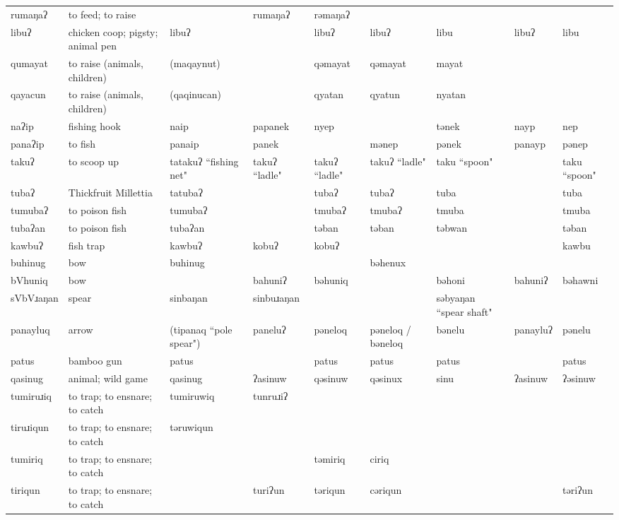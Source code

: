 \begin{landscape}
\begin{longtable}{*{9}{p{}}}
\text{*}rumaŋaʔ & to feed; to raise &  & rumaŋaʔ & rəmaŋaʔ &  &  &  & \\
\text{*}libuʔ & chicken coop; pigsty; animal pen & libuʔ &  & libuʔ & libuʔ & libu & libuʔ & libu\\
\text{*}qumayat & to raise (animals, children) & (maqaynut) &  & qəmayat & qəmayat & mayat &  & \\
\text{*}qayacun & to raise (animals, children) & (qaqinucan) &  & qyatan & qyatun & nyatan &  & \\
\text{*}naʔip & fishing hook & naip & papanek & nyep &  & tənek & nayp & nep\\
\text{*}panaʔip & to fish & panaip & panek &  & mənep & pənek & panayp & pənep\\
\text{*}takuʔ & to scoop up & tatakuʔ ``fishing net" & takuʔ ``ladle" & takuʔ ``ladle" & takuʔ ``ladle" & taku ``spoon" &  & taku ``spoon"\\
\text{*}tubaʔ & Thickfruit Millettia & tatubaʔ &  & tubaʔ & tubaʔ & tuba &  & tuba\\
\text{*}tumubaʔ & to poison fish & tumubaʔ &  & tmubaʔ & tmubaʔ & tmuba &  & tmuba\\
\text{*}tubaʔan & to poison fish & tubaʔan &  & təban & təban & təbwan &  & təban\\
\text{*}kawbuʔ & fish trap & kawbuʔ & kobuʔ & kobuʔ &  &  &  & kawbu\\
\text{*}buhinug & bow & buhinug &  &  & bəhenux &  &  & \\
\text{*}bVhuniq & bow &  & bahuniʔ & bəhuniq &  & bəhoni & bahuniʔ & bəhawni\\
\text{*}sVbVɹaŋan & spear & sinbaŋan & sinbuɹaŋan &  &  & səbyaŋan ``spear shaft" &  & \\
\text{*}panayluq & arrow & (tipanaq ``pole spear") & paneluʔ & pəneloq & pəneloq / bəneloq & bənelu & panayluʔ & pənelu\\
\text{*}patus & bamboo gun & patus &  & patus & patus & patus &  & patus\\
\text{*}qasinug & animal; wild game & qasinug & ʔasinuw & qəsinuw & qəsinux & sinu & ʔasinuw & ʔəsinuw\\
\text{*}tumiruɹiq & to trap; to ensnare; to catch & tumiruwiq & tunruɹiʔ &  &  &  &  & \\
\text{*}tiruɹiqun & to trap; to ensnare; to catch & təruwiqun &  &  &  &  &  & \\
\text{*}tumiriq & to trap; to ensnare; to catch &  &  & təmiriq & ciriq &  &  & \\
\text{*}tiriqun & to trap; to ensnare; to catch &  & turiʔun & təriqun & cəriqun &  &  & təriʔun\\

\end{longtable}
\end{landscape}
